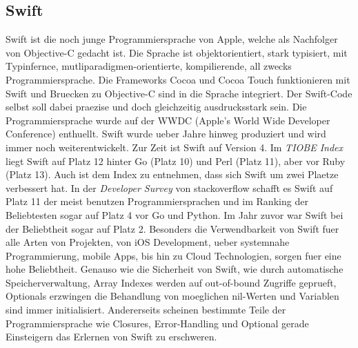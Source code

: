 \subsection{Swift}
\label{subsection:swift}
Swift ist die noch junge Programmiersprache von Apple, welche als Nachfolger von Objective-C gedacht ist. Die Sprache ist objektorientiert, stark typisiert, mit Typinfernce, mutliparadigmen-orientierte, kompilierende, all zwecks Programmiersprache. Die Frameworks Cocoa und Cocoa Touch funktionieren mit Swift und Bruecken zu Objective-C sind in die Sprache integriert. Der Swift-Code selbst soll dabei praezise und doch gleichzeitig ausdrucksstark sein\parencite{appleswift}.  Die Programmiersprache wurde auf der WWDC (Apple's World Wide Developer Conference)\parencite{swiftannounced} enthuellt. Swift wurde ueber Jahre hinweg produziert und wird immer noch weiterentwickelt. Zur Zeit ist Swift auf Version 4\parencite{ swift4}. Im \textit{TIOBE Index}\parencite{tiobe} liegt Swift auf Platz 12 hinter Go (Platz 10) und Perl (Platz 11), aber vor Ruby (Platz 13). Auch ist dem Index zu entnehmen, dass sich Swift um zwei Plaetze verbessert hat. In der \textit{Developer Survey} von stackoverflow schafft es Swift auf Platz 11 der meist benutzen Programmiersprachen und im Ranking der Beliebtesten sogar auf Platz 4 vor Go und Python\parencite{survey2017}. Im Jahr zuvor war Swift bei der Beliebtheit sogar auf Platz 2\parencite{survey2016}. Besonders die Verwendbarkeit von Swift fuer alle Arten von Projekten, von iOS Development, ueber systemnahe Programmierung, mobile Apps, bis hin zu Cloud Technologien, sorgen fuer eine hohe Beliebtheit. Genauso wie die Sicherheit von Swift, wie durch automatische Speicherverwaltung, Array Indexes werden auf out-of-bound Zugriffe geprueft, Optionals erzwingen die Behandlung von moeglichen nil-Werten und Variablen sind immer initialisiert. Andererseits scheinen bestimmte Teile der Programmiersprache wie Closures, Error-Handling und Optional gerade Einsteigern das Erlernen von Swift zu erschweren\parencite{studyonswift}.
